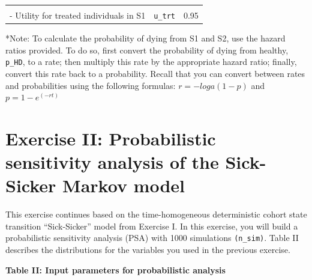 \documentclass[]{article}
\begin{document}
\begin{longtable}[]{@{}llc@{}}
\begin{minipage}[t]{0.20\columnwidth}
\strut
\end{minipage}\tabularnewline
\begin{minipage}[t]{0.47\columnwidth}\raggedright\strut
- Utility for treated individuals in S1\strut
\end{minipage} & \begin{minipage}[t]{0.18\columnwidth}\raggedright\strut
\texttt{u\_trt}\strut
\end{minipage} & \begin{minipage}[t]{0.20\columnwidth}\centering\strut
0.95\strut
\end{minipage}\tabularnewline
\bottomrule
\end{longtable}

*Note: To calculate the probability of dying from S1 and S2, use the
hazard ratios provided. To do so, first convert the probability of dying
from healthy, \texttt{p\_HD}, to a rate; then multiply this rate by the
appropriate hazard ratio; finally, convert this rate back to a
probability. Recall that you can convert between rates and probabilities
using the following formulas: \(r = -loga(1-p)\) and \(p = 1-e^{(-rt)}\)

\newpage

\section{Exercise II: Probabilistic sensitivity analysis of the
Sick-Sicker Markov
model}\label{exercise-ii-probabilistic-sensitivity-analysis-of-the-sick-sicker-markov-model}

This exercise continues based on the time-homogeneous deterministic
cohort state transition ``Sick-Sicker'' model from Exercise I. In this
exercise, you will build a probabilistic sensitivity analysis (PSA) with
1000 simulations \texttt{(n\_sim)}. Table II describes the distributions
for the variables you used in the previous exercise.

\textbf{Table II: Input parameters for probabilistic analysis}
\end{document}
